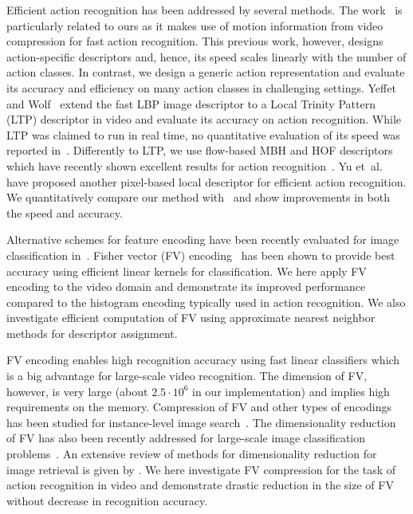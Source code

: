 \documentclass[10pt,twocolumn,letterpaper]{article}
\begin{document}
Efficient action recognition has been addressed by several methods. The work~\cite{mpeg3,mpeg2,mpeg1} is particularly related to ours as it makes use of motion information from video compression for fast action recognition. This previous work, however, designs action-specific descriptors and, hence, its speed scales linearly with the number of action classes. In contrast, we design a generic action representation and evaluate its accuracy and efficiency on many action classes in challenging settings. 
Yeffet and Wolf~\cite{Yeffet09} extend the fast LBP image descriptor to a Local Trinity Pattern (LTP) descriptor in video and evaluate its accuracy on action recognition. While LTP was claimed to run in real time, no quantitative evaluation of its speed was reported in~\cite{Yeffet09}. Differently to LTP, we use flow-based MBH and HOF descriptors which have recently shown excellent results for action recognition~\cite{Wang12}. Yu et~al.~\cite{Yu10} have proposed another pixel-based local descriptor for efficient action recognition. We quantitatively compare our method with~\cite{Yu10} and show improvements in both the speed and accuracy.

Alternative schemes for feature encoding
have been recently evaluated for image classification in~\cite{Chatfield11}. 
Fisher vector (FV) encoding~\cite{Perronnin10} has been shown to provide best accuracy using efficient linear kernels for classification. We here apply FV encoding to the video domain and demonstrate its improved performance compared to the histogram encoding typically used in action recognition. We also investigate efficient computation of FV using approximate nearest neighbor methods for descriptor assignment.

FV encoding enables high recognition accuracy using fast linear classifiers which is a big advantage for large-scale video recognition. The dimension of FV, however, is very large (about $2.5\cdot10^6$ in our implementation) and implies high requirements on the memory. Compression of FV and other types of encodings has been studied for instance-level image search~\cite{Jegou12}. The dimensionality reduction of FV has also been recently addressed for large-scale image classification problems~\cite{Mensink12,Perronnin12,Sanchez13}. An extensive review of methods for dimensionality reduction for image retrieval is given by \cite{Grauman13}.
We here investigate FV compression for the task of action recognition in video and demonstrate drastic reduction in the size of FV without decrease in recognition accuracy.
\end{document}
